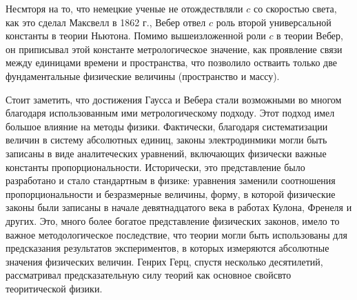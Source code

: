 \documentclass[12pt, oneside, a4paper]{article}
\begin{document}
Несмторя на то, что немецкие ученые не отождествляли $c$ со скоростью света, как это сделал Максвелл в 1862 г., Вебер отвел $c$ роль второй универсальной константы в теории Ньютона. Помимо вышеизложенной роли $c$ в теории Вебер, он приписывал этой константе метрологическое значение, как проявление связи между единицами времени и пространства, что позволило остваить только две фундаментальные физические величины (пространство и массу).

Стоит заметить, что достижения Гаусса и Вебера стали возможными во многом благодаря использованным ими метрологическому подходу. Этот подход имел большое влияние на методы физики. Фактически, благодаря систематизации величин в систему абсолютных единиц, законы электродинмики могли быть записаны в виде аналитеческих уравнений, включающих физически важные константы пропорциональности. Исторически, это представление было разработано и стало стандартным в физике: уравнения заменили соотношения пропорциональности и безразмерные величины, форму, в которой физические законы были записаны в начале девятнадцатого века в работах Кулона, Френеля и других. Это, много более богатое представление физических законов, имело то важное методологическое последствие, что теории могли быть использованы для предсказания результатов экспериментов, в которых измеряются абсолютные значения физических величин. Генрих Герц, спустя несколько десятилетий, рассматривал предсказательную силу теорий как основное свойсвто теоритической физики.
\end{document}
